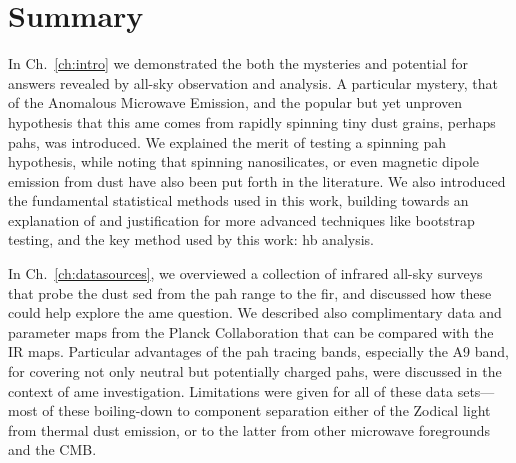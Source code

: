 \chapter{Summary}
  \label{ch:Summary}

  In Ch.~\ref{ch:intro} we demonstrated the both the mysteries and potential for answers revealed by all-sky observation and analysis. A particular mystery, that of the Anomalous Microwave Emission, and the popular but yet unproven hypothesis that this \gls{ame} comes from rapidly spinning tiny dust grains, perhaps \gls{pah}s, was introduced. We explained the merit of testing a spinning \gls{pah} hypothesis, while noting that spinning nanosilicates, or even magnetic dipole emission from dust have also been put forth in the literature. We also introduced the fundamental statistical methods used in this work, building towards an explanation of and justification for more advanced techniques like bootstrap testing, and the key method used by this work: \gls{hb} analysis.

  In Ch.~\ref{ch:datasources}, we overviewed a collection of infrared all-sky surveys that probe the dust \gls{sed} from the \gls{pah} range to the \gls{fir}, and discussed how these could help explore the \gls{ame} question. We described also complimentary data and parameter maps from the Planck Collaboration that can be compared with the IR maps. Particular advantages of the \gls{pah} tracing bands, especially the A9 band, for covering not only neutral but potentially charged \gls{pah}s, were discussed in the context of \gls{ame} investigation. Limitations were given for all of these data sets--- most of these boiling-down to component separation either of the Zodical light from thermal dust emission, or to the latter from other microwave foregrounds and the CMB.

